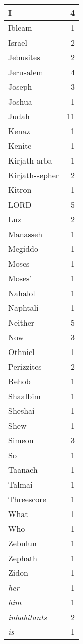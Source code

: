 \begin{center}
\begin{longtable}{l|r}
I & 4 \\ \hline
Ibleam & 1 \\ \hline
Israel & 2 \\ \hline
Jebusites & 2 \\ \hline
Jerusalem & 4 \\ \hline
Joseph & 3 \\ \hline
Joshua & 1 \\ \hline
Judah & 11 \\ \hline
Kenaz & 1 \\ \hline
Kenite & 1 \\ \hline
Kirjath-arba & 1 \\ \hline
Kirjath-sepher & 2 \\ \hline
Kitron & 1 \\ \hline
LORD & 5 \\ \hline
Luz & 2 \\ \hline
Manasseh & 1 \\ \hline
Megiddo & 1 \\ \hline
Moses & 1 \\ \hline
Moses' & 1 \\ \hline
Nahalol & 1 \\ \hline
Naphtali & 1 \\ \hline
Neither & 5 \\ \hline
Now & 3 \\ \hline
Othniel & 1 \\ \hline
Perizzites & 2 \\ \hline
Rehob & 1 \\ \hline
Shaalbim & 1 \\ \hline
Sheshai & 1 \\ \hline
Shew & 1 \\ \hline
Simeon & 3 \\ \hline
So & 1 \\ \hline
Taanach & 1 \\ \hline
Talmai & 1 \\ \hline
Threescore & 1 \\ \hline
What & 1 \\ \hline
Who & 1 \\ \hline
Zebulun & 1 \\ \hline
Zephath & 1 \\ \hline
Zidon & 1 \\ \hline
\emph{her} & 1 \\ \hline
\emph{him} & 1 \\ \hline
\emph{inhabitants} & 2 \\ \hline
\emph{is} & 1 \\ \hline

\end{longtable}
\end{center}
